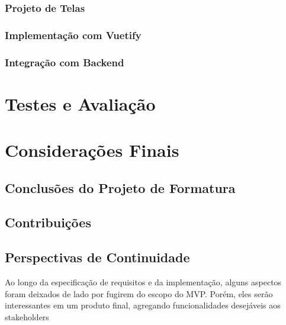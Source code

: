 \documentclass[]{politex}
\begin{document}

\subsection{Projeto de Telas}


\subsection{Implementação com Vuetify}


\subsection{Integração com Backend}


\chapter{Testes e Avaliação}


\chapter{Considerações Finais}


\section{Conclusões do Projeto de Formatura}


\section{Contribuições}


\section{Perspectivas de Continuidade}

Ao longo da especificação de requisitos e da implementação, alguns aspectos
foram deixados de lado por fugirem do escopo do MVP. Porém, eles serão
interessantes em um produto final, agregando funcionalidades desejáveis aos
stakeholders
\end{document}
